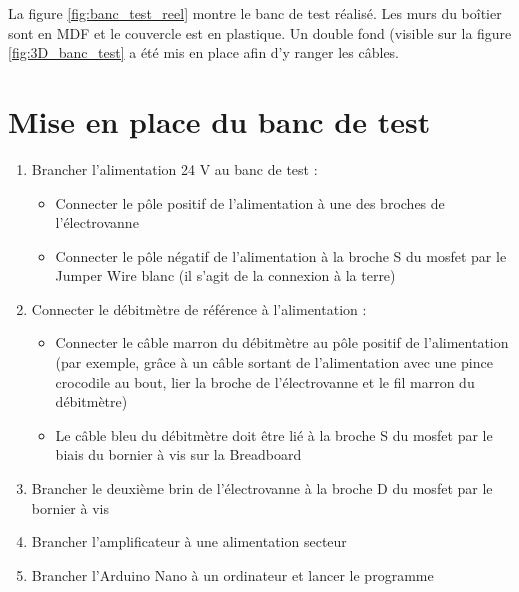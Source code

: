 La figure \ref{fig:banc_test_reel} montre le banc de test réalisé. Les murs du boîtier sont en MDF et le couvercle est en plastique. Un double 
fond (visible sur la figure \ref{fig:3D_banc_test} a été mis en place afin d'y ranger les câbles. 

\newpage
\section{Mise en place du banc de test}
\begin{enumerate}
    \item Brancher l'alimentation 24 V au banc de test :
          \begin{itemize}
              \item Connecter le pôle positif de l'alimentation à une des broches de l'électrovanne
              \item Connecter le pôle négatif de l'alimentation à la broche S du \gls{mosfet} par le Jumper Wire blanc (il s'agit de la connexion à la terre)
          \end{itemize}
          
    \item Connecter le débitmètre de référence à l'alimentation :
          \begin{itemize}
              \item Connecter le câble marron du débitmètre au pôle positif de l'alimentation (par exemple, grâce à un câble sortant de l'alimentation
                    avec une pince crocodile au bout, lier la broche de l'électrovanne et le fil marron du débitmètre)
              \item Le câble bleu du débitmètre doit être lié à la broche S du \gls{mosfet} par le biais du bornier à vis sur la Breadboard
          \end{itemize}
          
          
    \item Brancher le deuxième brin de l'électrovanne à la broche D du \gls{mosfet} par le bornier à vis\\
          
    \item Brancher l'amplificateur à une alimentation secteur\\
          
    \item Brancher l'Arduino Nano à un ordinateur et lancer le programme\\
          

\end{enumerate}
